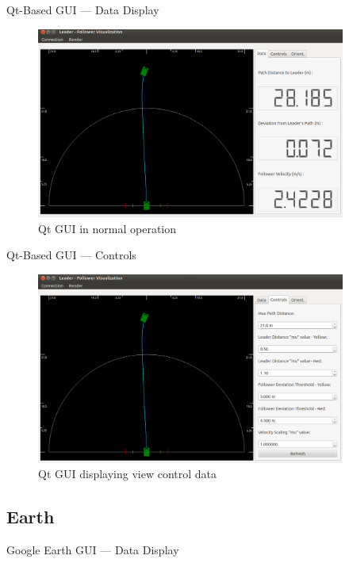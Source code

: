 \documentclass{beamer}
\begin{document}
    \begin{frame}{Qt-Based GUI --- Data Display}
      \begin{figure}[ht] \centering
        \includegraphics[width=4in] {../graphics/final_design_data.png}
        \caption{Qt GUI in normal operation} \label{fig:qt_data_display}
      \end{figure}
    \end{frame}

    \begin{frame}{Qt-Based GUI --- Controls}
      \begin{figure}[ht] \centering
        \includegraphics[width=4in] {../graphics/final_design_opts.png}
        \caption{Qt GUI displaying view control data} \label{fig:qt_controls}
      \end{figure}
    \end{frame}


  \subsection{Earth}

    \begin{frame}{Google Earth GUI --- Data Display}
    \end{frame}
\end{document}
